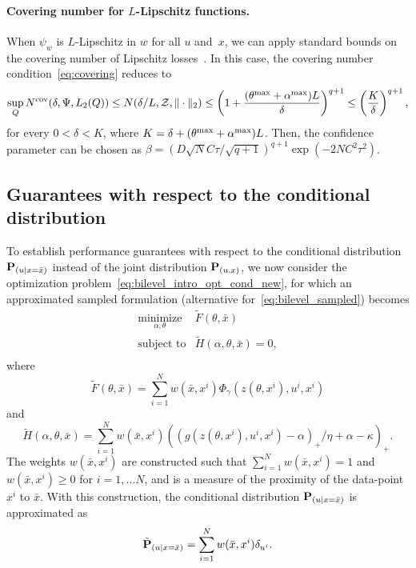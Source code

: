\paragraph{Covering number for $L$-Lipschitz functions.} When $\psi_{w}$ is $L$-Lipschitz in $w$ for all $u$ and~$x$,
we can apply standard bounds on the covering number of Lipschitz losses~\citep{empirical,covering,covering2}.
In this case, the covering number condition~\eqref{eq:covering} reduces to
\begin{equation*}
\sup_Q N^{\text{cov}}(\delta,\Psi,L_2(Q)) \leq N(\delta/L,\mathcal{Z},\|\cdot\|_2) \leq  \left (1 + \frac{(\theta^{\rm max} +\alpha^{\rm max})L}{\delta}\right )^{q+1} \leq \left (\frac{K}{\delta}\right )^{q+1},
\end{equation*} 
for every $0 < \delta < K$, where $K = \delta + (\theta^{\rm max} +\alpha^{\rm max})L$.
Then, the confidence parameter can be chosen as $\beta =  (D\sqrt{N}C\tau/\sqrt{q+1})^{q+1}\exp(-2NC^2\tau^2)$.


\subsection{Guarantees with respect to the conditional distribution}
\label{sec:cond_guarantee}
To establish performance guarantees with respect to the conditional distribution ${\mathbf P}_{(u|x = \bar{x})}$ instead of the joint distribution ${\mathbf P}_{(u,x)}$, we now consider the optimization problem~\eqref{eq:bilevel_intro_opt_cond_new},
for which an approximated sampled formulation (alternative for~\eqref{eq:bilevel_sampled}) becomes
\begin{equation}
	\label{eq:bilevel_sampled_cond}
	\begin{array}{ll}
		\underset{\alpha,\theta}{\mbox{minimize}} & \tilde{F}(\theta,\bar{x}) \\
		\mbox{subject to} & \tilde{H}(\alpha,\theta,\bar{x}) = 0,\\
	\end{array}
\end{equation}
where
$$\tilde{F}(\theta,\bar{x}) = \sum_{i=1}^N w(\bar{x},x^i)\Phi_{\gamma}(z(\theta,x^i),u^i, x^i)$$
and 
 $$\tilde{H}(\alpha,\theta,\bar{x}) = \sum_{i=1}^N w(\bar{x},x^i)((g(z(\theta,x^i),u^i,x^i)- \alpha)_+/\eta + \alpha - \kappa)_+.$$
The weights $w(\bar{x},x^i)$ are constructed such that $\sum_{i=1}^Nw(\bar{x},x^i) = 1$ and $w(\bar{x},x^i) \geq 0$ for $i = 1,\dots N$, and is a measure of the proximity of the data-point $x^i$ to $\bar{x}$. With this construction, the conditional distribution ${\mathbf P}_{(u|x = \bar{x})}$ is approximated as
$$\tilde{{\mathbf P}}_{(u|x = \bar{x})} = \sum_{i=1}^Nw(\bar{x},x^i)\delta_{u^i}.$$

